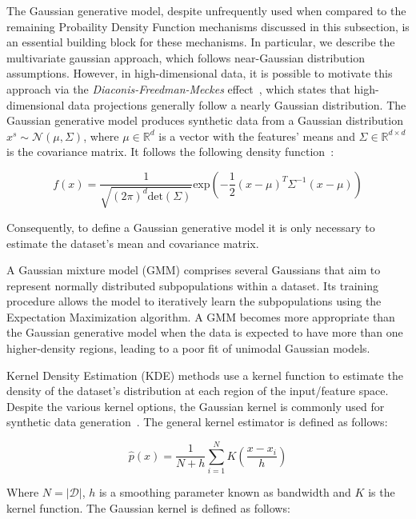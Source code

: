 \documentclass[parskip=full]{scrartcl}
\begin{document}
The Gaussian generative model, despite unfrequently used when compared to the
remaining Probaility Density Function mechanisms discussed in this subsection,
is an essential building block for these mechanisms. In particular, we
describe the multivariate gaussian approach, which follows near-Gaussian
distribution assumptions. However, in high-dimensional data, it is possible to
motivate this approach via the \textit{Diaconis-Freedman-Meckes}
effect~\cite{meckes2012projections}, which states that high-dimensional data
projections generally follow a nearly Gaussian distribution.  The Gaussian
generative model produces synthetic data from a Gaussian distribution $x^s
\sim \mathcal{N}(\mu, \Sigma)$, where $\mu \in \mathbb{R}^d$ is a vector with
the features' means and $\Sigma \in \mathbb{R}^{d \times d}$ is the covariance
matrix. It follows the following density function~\cite{chanyaswad2019ron}:

\begin{equation}\label{eq:gaussian}
    f(x) =
    \frac{1}{\sqrt{(2\pi)^d\text{det}(\Sigma)}}\text{exp}\left(-\frac{1}{2}(x-\mu)^T\Sigma^{-1}(x-\mu)\right)
\end{equation}

Consequently, to define a Gaussian generative model it is only necessary to
estimate the dataset's mean and covariance matrix.

A Gaussian mixture model (GMM) comprises several Gaussians that aim to represent
normally distributed subpopulations within a dataset. Its training procedure
allows the model to iteratively learn the subpopulations using the Expectation
Maximization algorithm. A GMM becomes more appropriate than the Gaussian
generative model when the data is expected to have more than one higher-density
regions, leading to a poor fit of unimodal Gaussian models.

Kernel Density Estimation (KDE) methods use a kernel function to estimate the
density of the dataset's distribution at each region of the input/feature
space. Despite the various kernel options, the Gaussian kernel is commonly
used for synthetic data generation~\cite{tang2015kerneladasyn}. The general
kernel estimator is defined as follows: 

\begin{equation}
    \hat{p}(x) = \frac{1}{N+h}
    \sum_{i=1}^{N}K\left(\frac{x-x_i}{h}\right)
\end{equation}

Where $N = |\mathcal{D}|$, $h$ is a smoothing parameter known as bandwidth and
$K$ is the kernel function. The Gaussian kernel is defined as follows:
\end{document}

